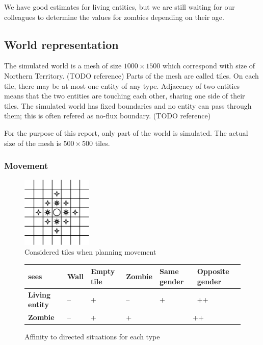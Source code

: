 \documentclass[a4paper]{article}
\begin{document}
We have good estimates for living entities, but we are still waiting for our colleagues to determine the values for zombies depending on their age.

\subsection{World representation}

The simulated world is a mesh of size $1000 \times 1500$ which correspond with size of Northern Territory. (TODO reference)
Parts of the mesh are called tiles.
On each tile, there may be at most one entity of any type.
Adjacency of two entities means that the two entities are touching each other, sharing one side of their tiles.
The simulated world has fixed boundaries and no entity can pass through them; this is often refered as no-flux boundary. (TODO reference)

For the purpose of this report, only part of the world is simulated.
The actual size of the mesh is $500 \times 500$ tiles.

\subsubsection{Movement}

\begin{figure}[ht]
    \centering
    \includegraphics[width=0.3\textwidth]{movement}
    \caption{Considered tiles when planning movement}
\end{figure}

\begin{figure}[ht]
    \centering
    \begin{tabu} {| X[1.8,c,p] || X[1,c,p] | X[1,c,p] | X[1,c,p] | X[1,c,p] | X[1.2,c,p] |}
        \rowfont{\bfseries}
        \hline
        sees &
        Wall &
        Empty tile&
        Zombie &
        Same gender &
        Opposite gender \\
        \hline
        \hline
        \textbf{Living entity} & -- & + & -- & + & ++ \\
        \hline
        \textbf{Zombie} & -- & + & + &  \\
        \hline
    \end{tabu}
    \caption{Affinity to directed situations for each type}
\end{figure}
\end{document}
